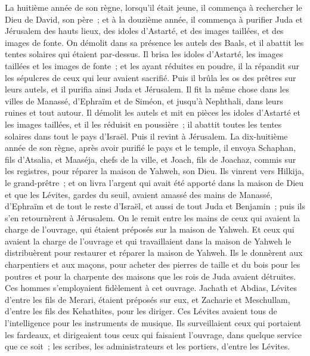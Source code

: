 \begin{multicols}{2}
La huitième année de son règne, lorsqu'il était jeune, il commença à rechercher le Dieu de David, son père~; et à la douzième année, il commença à purifier Juda et Jérusalem des hauts lieux, des idoles d'Astarté, et des images taillées, et des images de fonte.
On démolit dans sa présence les autels des Baals, et il abattit les tentes solaires qui étaient par-dessus. Il brisa les idoles d'Astarté, les images taillées et les images de fonte~; et les ayant réduites en poudre, il la répandit sur les sépulcres de ceux qui leur avaient sacrifié.
Puis il brûla les os des prêtres sur leurs autels, et il purifia ainsi Juda et Jérusalem.
Il fit la même chose dans les villes de Manassé, d'Ephraïm et de Siméon, et jusqu'à Nephthali, dans leurs ruines et tout autour.
Il démolit les autels et mit en pièces les idoles d'Astarté et les images taillées, et il les réduisit en poussière~; il abattit toutes les tentes solaires dans tout le pays d'Israël. Puis il revint à Jérusalem.
La dix-huitième année de son règne, après avoir purifié le pays et le temple, il envoya Schaphan, fils d'Atsalia, et Maaséja, chefs de la ville, et Joach, fils de Joachaz, commis sur les registres, pour réparer la maison de Yahweh, son Dieu.
Ils vinrent vers Hilkija, le grand-prêtre~; et on livra l'argent qui avait été apporté dans la maison de Dieu et que les Lévites, gardes du seuil, avaient amassé des mains de Manassé, d'Ephraïm et de tout le reste d'Israël, et aussi de tout Juda et Benjamin~; puis ils s'en retournèrent à Jérusalem.
On le remit entre les mains de ceux qui avaient la charge de l'ouvrage, qui étaient préposés sur la maison de Yahweh. Et ceux qui avaient la charge de l'ouvrage et qui travaillaient dans la maison de Yahweh le distribuèrent pour restaurer et réparer la maison de Yahweh.
Ils le donnèrent aux charpentiers et aux maçons, pour acheter des pierres de taille et du bois pour les poutres et pour la charpente des maisons que les rois de Juda avaient détruites.
Ces hommes s'employaient fidèlement à cet ouvrage. Jachath et Abdias, Lévites d'entre les fils de Merari, étaient préposés sur eux, et Zacharie et Meschullam, d'entre les fils des Kehathites, pour les diriger. Ces Lévites avaient tous de l'intelligence pour les instruments de musique.
Ils surveillaient ceux qui portaient les fardeaux, et dirigeaient tous ceux qui faisaient l'ouvrage, dans quelque service que ce soit~; les scribes, les administrateurs et les portiers, d'entre les Lévites.

\end{multicols}
